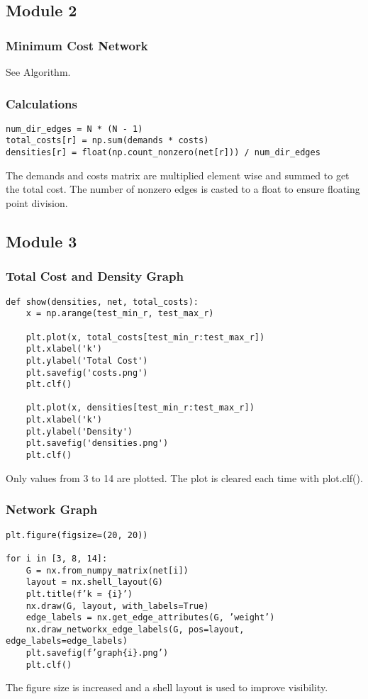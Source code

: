 \documentclass{article}
\begin{document}
\subsection{Module 2}
\subsubsection{Minimum Cost Network}
See Algorithm.

\subsubsection{Calculations}
\begin{verbatim}
num_dir_edges = N * (N - 1)
total_costs[r] = np.sum(demands * costs)
densities[r] = float(np.count_nonzero(net[r])) / num_dir_edges
\end{verbatim}
The demands and costs matrix are multiplied element wise and summed to get the total cost. The number of nonzero edges is casted to a float to ensure floating point division.
\subsection{Module 3}
\subsubsection{Total Cost and Density Graph}
\begin{verbatim}
def show(densities, net, total_costs):
    x = np.arange(test_min_r, test_max_r)
     
    plt.plot(x, total_costs[test_min_r:test_max_r])
    plt.xlabel('k')
    plt.ylabel('Total Cost')
    plt.savefig('costs.png')
    plt.clf()
    
    plt.plot(x, densities[test_min_r:test_max_r])
    plt.xlabel('k')
    plt.ylabel('Density')
    plt.savefig('densities.png')
    plt.clf()
\end{verbatim}
Only values from 3 to 14 are plotted. The plot is cleared each time with plot.clf().

\subsubsection{Network Graph}
\begin{verbatim}
plt.figure(figsize=(20, 20))

for i in [3, 8, 14]:
    G = nx.from_numpy_matrix(net[i])
    layout = nx.shell_layout(G)
    plt.title(f’k = {i}’)
    nx.draw(G, layout, with_labels=True)
    edge_labels = nx.get_edge_attributes(G, ’weight’)
    nx.draw_networkx_edge_labels(G, pos=layout, edge_labels=edge_labels)
    plt.savefig(f’graph{i}.png’)
    plt.clf()
\end{verbatim}
The figure size is increased and a shell layout is used to improve visibility.
\end{document}
